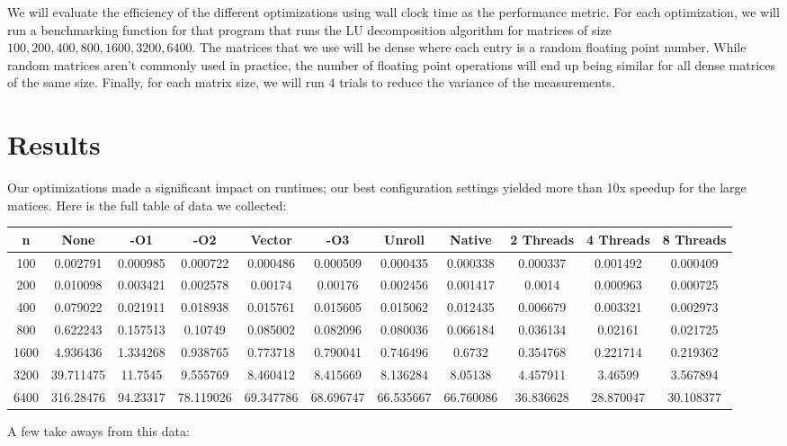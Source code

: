 \documentclass[12]{article}
\begin{document}
We will evaluate the efficiency of the different optimizations using wall clock time as the performance metric.  For each optimization, we will run a benchmarking function for that program that runs the LU decomposition algorithm for matrices of size $100,200,400,800,1600,3200,6400$.  The matrices that we use will be dense where each entry is a random floating point number.  While random matrices aren't commonly used in practice, the number of floating point operations will end up being similar for all dense matrices of the same size.  Finally, for each matrix size, we will run $4$ trials to reduce the variance of the measurements.

\section{Results}

Our optimizations made a significant impact on runtimes; our best configuration settings  yielded more than 10x speedup for the large matices.  Here is the full table of data we collected:

\hskip-2.2cm
\begin{tabular}{|c|c|c|c|c|c|c|c|c|c|c|}
\hline
n & None & -O1 & -O2 & Vector & -O3 & Unroll & Native & 2 Threads & 4 Threads & 8 Threads\\
\hline
100	& 0.002791 & 0.000985 & 0.000722 & 0.000486 & 0.000509 & 0.000435 & 0.000338 & 	0.000337 & 0.001492	& 0.000409 \\
200	& 0.010098 & 0.003421 &	0.002578 &	0.00174 & 0.00176 & 0.002456 & 0.001417 & 	0.0014 & 0.000963 &	0.000725 \\
400	& 0.079022 & 0.021911 & 0.018938 & 0.015761 & 0.015605 & 0.015062 & 0.012435 & 0.006679 & 0.003321 & 0.002973 \\
800	& 0.622243 & 0.157513 & 0.10749 & 0.085002 & 0.082096 & 0.080036 & 0.066184 & 0.036134 & 0.02161 & 0.021725 \\
1600 & 4.936436 & 1.334268 & 0.938765 & 0.773718 & 0.790041 & 0.746496 & 0.6732 &	0.354768 & 0.221714 & 0.219362 \\
3200&39.711475&11.7545&9.555769&8.460412&	8.415669&8.136284&8.05138&4.457911&3.46599&	3.567894 \\

6400&316.28476&94.23317&78.119026&	69.347786&68.696747&66.535667&66.760086&	36.836628&28.870047&30.108377 \\
\hline
\end{tabular}

A few take aways from this data:
\end{document}
